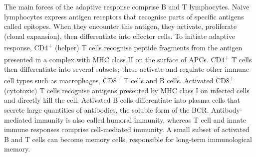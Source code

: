 The main forces of the adaptive response comprise B and T lymphocytes.
Naive lymphocytes express antigen receptors that recognise parts of specific antigens called epitopes.
When they encounter this antigen, they activate, proliferate (clonal expansion), then differentiate into effector cells.
To initiate adaptive response,
CD4\textsuperscript{+} (helper) T cells recognise peptide fragments from the antigen presented in a complex with \gls{MHC} class II on the surface of \glspl{APC}.
CD4\textsuperscript{+} T cells then differentiate into several subsets; these activate and regulate other immune cell types such as macrophages, CD8\textsuperscript{+} T cells and B cells.
Activated CD8\textsuperscript{+} (cytotoxic) T cells recognise antigens presented by \gls{MHC} class I on infected cells and directly kill the cell.
Activated B cells differentiate into plasma cells that secrete large quantities of antibodies, the soluble form of the \gls{BCR}.
Antibody-mediated immunity is also called humoral immunity,
whereas T cell and innate immune responses comprise cell-mediated immunity.
A small subset of activated B and T cells can become memory cells, responsible for long-term immunological memory.

